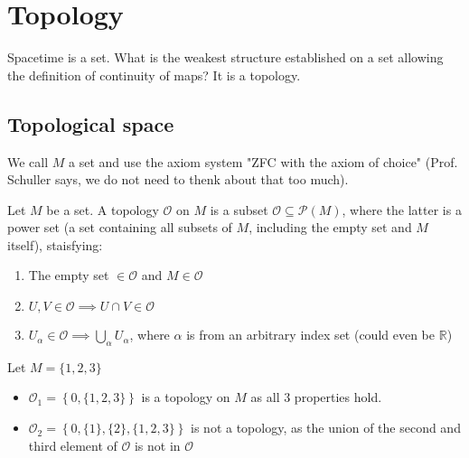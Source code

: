 
\section{Topology}

Spacetime is a set. What is the weakest structure established on a set allowing the definition of continuity of maps? It is a topology.

\subsection{Topological space}

We call $M$ a set and use the axiom system "ZFC with the axiom of choice" (Prof. Schuller says, we do not need to thenk about that too much).\\


\begin{framed}
\begin{definition}[Topology]
    \label{deftopo}
    Let $M$ be a set. A topology $\mathcal{O}$ on $M$ is a subset $\mathcal{O} \subseteq \mathcal{P}(M)$, where the latter is a power set (a set containing all subsets of $M$, including the empty set and $M$ itself), staisfying:
    \begin{enumerate}[noitemsep, topsep=0pt]
        \item The empty set $\in \mathcal{O}$ and $M\in \mathcal{O}$
        \item $U,V \in \mathcal{O} \implies U \cap V \in \mathcal{O}$
        \item $U_\alpha \in \mathcal{O} \implies \bigcup_{\alpha} U_\alpha$, where $\alpha$ is from an arbitrary index set (could even be $\mathbb{R}$)
    \end{enumerate}
\end{definition}
\end{framed}

\begin{example}[] 
    Let $M=\{1,2,3\}$
    \begin{itemize}[noitemsep, topsep=0pt]
        \item $\mathcal{O}_1 = \left \{ 0,\{1,2,3\} \right \}$
        is a topology on $M$ as all 3 properties hold.
        \item $\mathcal{O}_2 = \left \{ 0,\{1\},\{2\},\{1,2,3\} \right \}$ is not a topology, as the union of the second and third element of $\mathcal{O}$ is not in $\mathcal{O}$
    \end{itemize}
\end{example}

